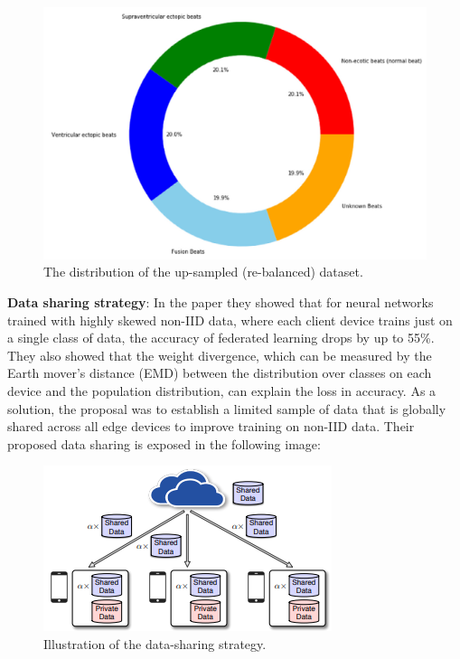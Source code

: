 \begin{figure}[H]
\centering
\includegraphics[scale=0.6]{img/metrics_ecg1_ROS.PNG}
\caption{The distribution of the up-sampled (re-balanced) dataset. \cite{metrics_ecg1}}
\label{fig:metrics_ecg1_ROS}
\end{figure}



\textbf{Data sharing strategy}: In the paper \cite{fl18} they showed that for neural networks trained with highly skewed non-IID data, where each client device trains just on a single class of data, the accuracy of federated learning drops by up to 55\%. They also showed that the weight divergence, which can be measured by the Earth mover's distance (EMD) between the distribution over classes on each device and the population distribution, can explain the loss in accuracy. As a solution, the proposal was to establish a limited sample of data that is globally shared across all edge devices to improve training on non-IID data. Their proposed data sharing is exposed in the following image:

\begin{figure}[H]
\centering
\includegraphics[scale=0.9]{img/fl18_datasharing.PNG}
\caption{ Illustration of the data-sharing strategy. \cite{fl18}}
\label{fig:fl18_datasharing}
\end{figure}





